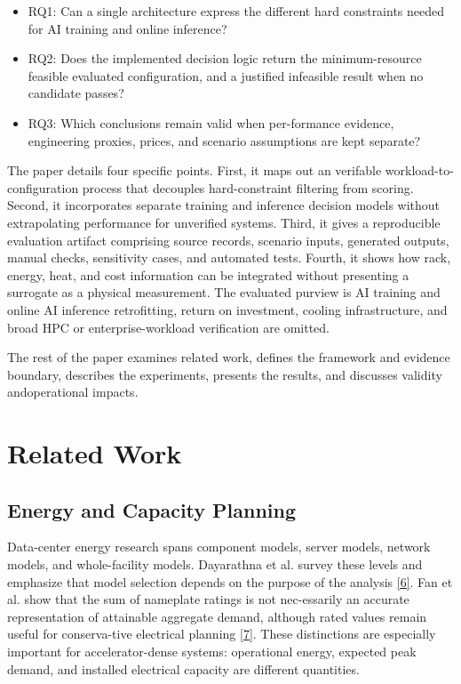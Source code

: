 \documentclass[final,3p,12pt,nopreprintline]{elsarticle}
\begin{document}
\begin{itemize}

\item RQ1: Can a single architecture express the different hard constraints needed for AI training and online inference?

\item RQ2: Does the implemented decision logic return the minimum-resource feasible evaluated configuration, and a justified infeasible result when no candidate passes?

\item RQ3: Which conclusions remain valid when per-formance evidence, engineering proxies, prices, and scenario assumptions are kept separate?

\end{itemize}

The paper details four specific points. First, it maps out an verifable workload-to-configuration process that decouples hard-constraint filtering from scoring. Second, it incorporates separate training and inference decision models without extrapolating  performance for unverified systems. Third, it gives a reproducible evaluation artifact comprising source records, scenario inputs, generated outputs, manual checks, sensitivity cases, and automated tests. Fourth, it shows how rack, energy, heat, and cost information can be integrated without presenting a surrogate as a physical measurement. The evaluated purview is AI training and online AI inference retrofitting, return on investment, cooling infrastructure, and broad HPC or enterprise-workload verification are omitted.


The rest of the paper examines related work, defines the framework and evidence boundary, describes the experiments, presents the results, and discusses validity andoperational impacts.


\section{Related Work}


\subsection{Energy and Capacity Planning}


Data-center energy research spans component models, server models, network models, and whole-facility models. Dayarathna et al. survey these levels and emphasize that model selection depends on the purpose of the analysis \hyperref[ref:6]{[6]}. Fan et al. show that the sum of nameplate ratings is not nec-essarily an accurate representation of attainable aggregate demand, although rated values remain useful for conserva-tive electrical planning \hyperref[ref:7]{[7]}. These distinctions are especially important for accelerator-dense systems: operational energy, expected peak demand, and installed electrical capacity are different quantities.
\end{document}

